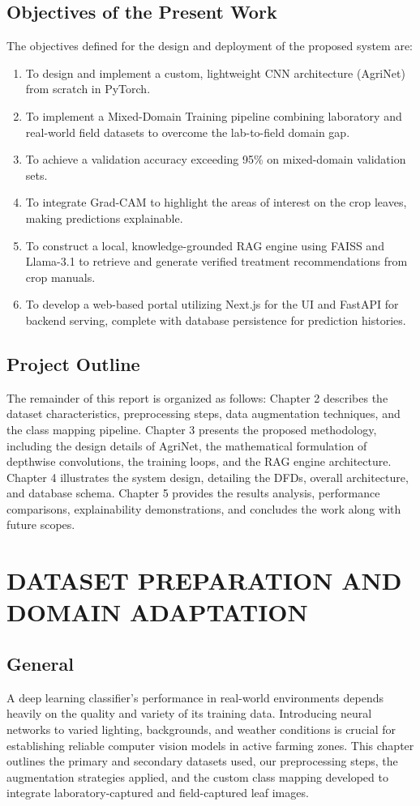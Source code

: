\documentclass[12pt, a4paper]{report}
\begin{document}
\section{Objectives of the Present Work}
The objectives defined for the design and deployment of the proposed system are:
\begin{enumerate}
    \item To design and implement a custom, lightweight CNN architecture (AgriNet) from scratch in PyTorch.
    \item To implement a Mixed-Domain Training pipeline combining laboratory and real-world field datasets to overcome the lab-to-field domain gap.
    \item To achieve a validation accuracy exceeding 95\% on mixed-domain validation sets.
    \item To integrate Grad-CAM to highlight the areas of interest on the crop leaves, making predictions explainable.
    \item To construct a local, knowledge-grounded RAG engine using FAISS and Llama-3.1 to retrieve and generate verified treatment recommendations from crop manuals.
    \item To develop a web-based portal utilizing Next.js for the UI and FastAPI for backend serving, complete with database persistence for prediction histories.
\end{enumerate}

\section{Project Outline}
The remainder of this report is organized as follows: Chapter 2 describes the dataset characteristics, preprocessing steps, data augmentation techniques, and the class mapping pipeline. Chapter 3 presents the proposed methodology, including the design details of AgriNet, the mathematical formulation of depthwise convolutions, the training loops, and the RAG engine architecture. Chapter 4 illustrates the system design, detailing the DFDs, overall architecture, and database schema. Chapter 5 provides the results analysis, performance comparisons, explainability demonstrations, and concludes the work along with future scopes.

\chapter{DATASET PREPARATION AND DOMAIN ADAPTATION}

\section{General}
A deep learning classifier's performance in real-world environments depends heavily on the quality and variety of its training data. Introducing neural networks to varied lighting, backgrounds, and weather conditions is crucial for establishing reliable computer vision models in active farming zones. This chapter outlines the primary and secondary datasets used, our preprocessing steps, the augmentation strategies applied, and the custom class mapping developed to integrate laboratory-captured and field-captured leaf images.
\end{document}
